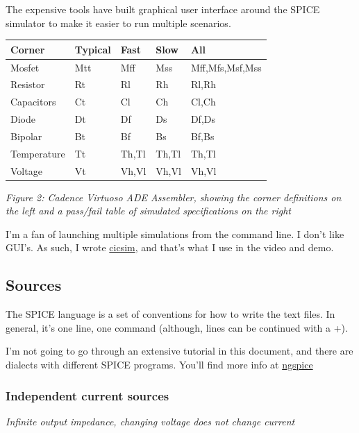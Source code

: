 The expensive tools have built graphical user interface around the SPICE
simulator to make it easier to run multiple scenarios.

\begin{longtable}[]{@{}lllll@{}}
\toprule\noalign{}
Corner & Typical & Fast & Slow & All \\
\midrule\noalign{}
\endhead
\bottomrule\noalign{}
\endlastfoot
Mosfet & Mtt & Mff & Mss & Mff,Mfs,Msf,Mss \\
Resistor & Rt & Rl & Rh & Rl,Rh \\
Capacitors & Ct & Cl & Ch & Cl,Ch \\
Diode & Dt & Df & Ds & Df,Ds \\
Bipolar & Bt & Bf & Bs & Bf,Bs \\
Temperature & Tt & Th,Tl & Th,Tl & Th,Tl \\
Voltage & Vt & Vh,Vl & Vh,Vl & Vh,Vl \\
\end{longtable}


{
\centering
{}
}

\emph{Figure 2: Cadence Virtuoso ADE Assembler, showing the corner
definitions on the left and a pass/fail table of simulated
specifications on the right}

I'm a fan of launching multiple simulations from the command line. I
don't like GUI's. As such, I wrote
\href{https://github.com/wulffern/cicsim/tree/main}{cicsim}, and that's
what I use in the video and demo.

\subsection{Sources}\label{sources}

The SPICE language is a set of conventions for how to write the text
files. In general, it's one line, one command (although, lines can be
continued with a +).

I'm not going to go through an extensive tutorial in this document, and
there are dialects with different SPICE programs. You'll find more info
at \href{http://ngspice.sourceforge.net/docs.html}{ngspice}

\subsubsection{Independent current
sources}\label{independent-current-sources}

\emph{Infinite output impedance, changing voltage does not change
current}

